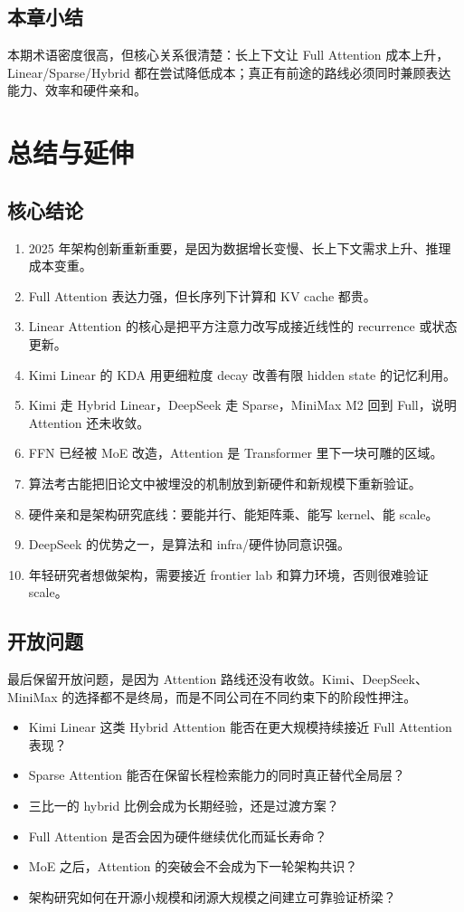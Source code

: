 \documentclass[a4paper]{article}
\begin{document}
\subsection{本章小结}

本期术语密度很高，但核心关系很清楚：长上下文让 Full Attention 成本上升，Linear/Sparse/Hybrid 都在尝试降低成本；真正有前途的路线必须同时兼顾表达能力、效率和硬件亲和。

\section{总结与延伸}

\subsection{核心结论}

\begin{enumerate}
\item 2025 年架构创新重新重要，是因为数据增长变慢、长上下文需求上升、推理成本变重。
\item Full Attention 表达力强，但长序列下计算和 KV cache 都贵。
\item Linear Attention 的核心是把平方注意力改写成接近线性的 recurrence 或状态更新。
\item Kimi Linear 的 KDA 用更细粒度 decay 改善有限 hidden state 的记忆利用。
\item Kimi 走 Hybrid Linear，DeepSeek 走 Sparse，MiniMax M2 回到 Full，说明 Attention 还未收敛。
\item FFN 已经被 MoE 改造，Attention 是 Transformer 里下一块可雕的区域。
\item 算法考古能把旧论文中被埋没的机制放到新硬件和新规模下重新验证。
\item 硬件亲和是架构研究底线：要能并行、能矩阵乘、能写 kernel、能 scale。
\item DeepSeek 的优势之一，是算法和 infra/硬件协同意识强。
\item 年轻研究者想做架构，需要接近 frontier lab 和算力环境，否则很难验证 scale。
\end{enumerate}

\subsection{开放问题}

最后保留开放问题，是因为 Attention 路线还没有收敛。Kimi、DeepSeek、MiniMax 的选择都不是终局，而是不同公司在不同约束下的阶段性押注。

\begin{itemize}
\item Kimi Linear 这类 Hybrid Attention 能否在更大规模持续接近 Full Attention 表现？
\item Sparse Attention 能否在保留长程检索能力的同时真正替代全局层？
\item 三比一的 hybrid 比例会成为长期经验，还是过渡方案？
\item Full Attention 是否会因为硬件继续优化而延长寿命？
\item MoE 之后，Attention 的突破会不会成为下一轮架构共识？
\item 架构研究如何在开源小规模和闭源大规模之间建立可靠验证桥梁？
\end{itemize}
\end{document}
